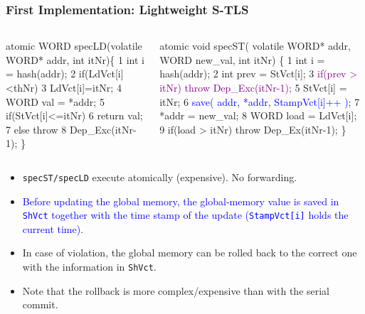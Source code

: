 \documentclass{beamer}
\newcommand{\blue}[1]{\textcolor{Blue}{{#1}}}
\newcommand{\purple}[1]{\textcolor{Purple}{{#1}}}
\newcommand{\emp}[1]{\textcolor{DikuRed}{ #1}}
\newcommand{\emphh}[1]{\textcolor{CosGreen}{ #1}}
\begin{document}
\begin{frame}[fragile,t]
  \frametitle{First Implementation: Lightweight S-TLS}

\begin{columns}
\begin{colorcode}
\emp{atomic} WORD \emphh{specLD}(volatile
      WORD* addr, int itNr)\{
1   int i = hash(addr);
2   \emphh{if(LdVct[i]<thNr)}
3      \emphh{LdVct[i]=itNr;}
4   WORD val = *addr;
5   if(StVct[i]<=itNr)
6      return val;
7   \emp{else throw}
8     \emp{Dep_Exc(itNr-1);}    \}
\end{colorcode}
\begin{colorcode}
\emp{atomic} void \emphh{specST}( volatile WORD* addr,
                    WORD new_val, int itNr) \{
1   int i    = hash(addr);
2   int prev = StVct[i];
3   \purple{if(prev > itNr) throw Dep_Exc(itNr-1);}
5   \emphh{StVct[i] = itNr;}
6   \blue{save( addr, *addr, StampVct[i]++ );}
7   *addr     = new_val;
8   WORD load = LdVct[i];
9   \alert{if(load > itNr) throw Dep_Ex(itNr-1);}  \}
\end{colorcode}
\end{columns}
\medskip\pause

\begin{itemize}
    \item {\tt specST/specLD} execute atomically (expensive). No forwarding.\medskip
    \item \blue{Before updating the global memory, the global-memory value is
                saved in {\tt ShVct} together with the time stamp of the update
                ({\tt StampVct[i]} holds the current time).}\medskip
    \item In case of violation, the global memory can be rolled back to 
            the correct one with the information in {\tt ShVct}.\medskip

    \item Note that the rollback is more complex/expensive than with the serial commit.
\end{itemize}

\end{frame}
\end{document}
